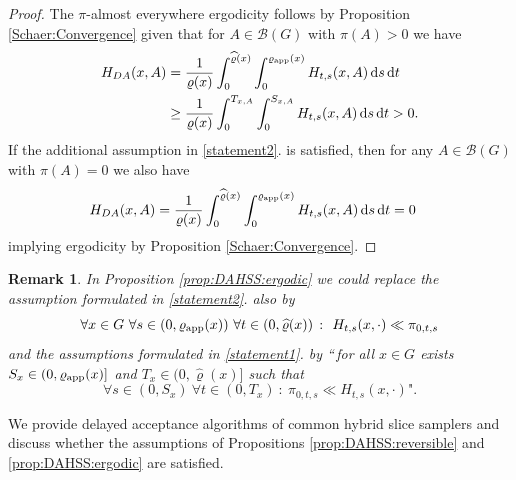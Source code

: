 \documentclass[sn-mathphys-num]{sn-jnl}%
\theoremstyle{thmstyleone}%
\theoremstyle{thmstyletwo}%
\newtheorem{remark}{Remark}%
\theoremstyle{thmstylethree}%
\newcommand{\rhoapp}{\varrho_{{\rm app}}}
\newcommand{\change}[1]{\bgroup\color{black}#1\egroup}    %
\begin{document}
\begin{proof}
   The %
   $\pi$-almost everywhere ergodicity follows by Proposition \ref{Schaer:Convergence} given that 
    for $A\in\mathcal{B}(G)$ with $\pi(A)>0$ we have 
    \begin{align*}
        H_{DA}(x,A) & = \frac{1}{\varrho(x)}\int_0^{\widehat{\varrho}(x)} \int_0^{\rhoapp(x)} H_{t,s}(x,A)  \, \mathrm{d}s  \, \mathrm{d}t\\
        & \geq \frac{1}{\varrho(x)}\int_0^{T_{x,A}} \int_0^{S_{x,A}} H_{t,s}(x,A)  \, \mathrm{d}s  \, \mathrm{d}t>0.
    \end{align*}
    If the additional assumption in \ref{statement2}. is satisfied, then for any $A\in\mathcal{B}(G)$ with $\pi(A)=0$ we also have
    \begin{align*}
        H_{DA}(x,A) & = \frac{1}{\varrho(x)}\int_0^{\widehat{\varrho}(x)} \int_0^{\rhoapp(x)} H_{t,s}(x,A)  \, \mathrm{d}s  \, \mathrm{d}t
        =
        0
    \end{align*}
    implying ergodicity by Proposition \ref{Schaer:Convergence}.
\end{proof}

\begin{remark}
In Proposition \ref{prop:DAHSS:ergodic} we could replace the assumption formulated in \ref{statement2}. also by
\[
    \forall x\in G \ 
    \forall s\in(0, \rhoapp(x)) \ 
    \forall t\in(0,\widehat{\varrho}(x)) \ \colon \
    H_{t,s}(x,\cdot) \ll \pi_{0,t,s}
\]
and the assumptions formulated in \ref{statement1}. by ``\,for all $x\in G$ exists $S_x \in (0, \rhoapp(x)]$ and $T_x \in (0, \widehat{\varrho}(x)]$ such that 
\[
    \forall s\in(0, S_x) \ 
    \forall t\in(0,T_x) \ \colon \ 
    \pi_{0,t,s} \ll H_{t,s}(x,\cdot)\text{"}.
\]
\end{remark}


\noindent We provide delayed acceptance algorithms of common hybrid slice samplers and discuss whether the assumptions of Propositions \ref{prop:DAHSS:reversible} and \ref{prop:DAHSS:ergodic} are satisfied. 
\end{document}
